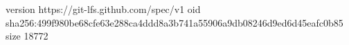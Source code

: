 version https://git-lfs.github.com/spec/v1
oid sha256:499f980be68cfe63e288ca4ddd8a3b741a55906a9db08246d9ed6d45eafc0b85
size 18772
